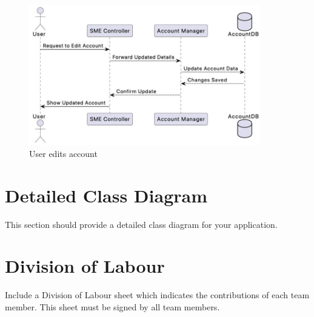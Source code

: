 \documentclass[]{article}
\begin{document}
\begin{figure}[H]
    \centering
    \includegraphics[width=0.9\textwidth]{S3/image (6).jpeg}
	\caption{User edits account}
\end{figure}




\section{Detailed Class Diagram}
\label{sec:detailed_class_diagram}
This section should provide a detailed class diagram for your application.

\appendix
\section{Division of Labour}
\label{sec:division_of_labour}
Include a Division of Labour sheet which indicates the contributions of each team member. This sheet must be signed by all team members.

\newpage
\end{document}
